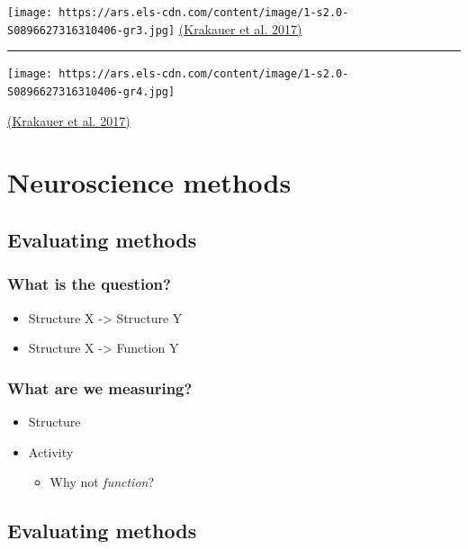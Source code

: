 \documentclass[]{article}
\providecommand{\tightlist}{%
  \setlength{\itemsep}{0pt}\setlength{\parskip}{0pt}}
\begin{document}
\texttt{[image: https://ars.els-cdn.com/content/image/1-s2.0-S0896627316310406-gr3.jpg]}
\href{http://dx.doi.org/10.1016/j.neuron.2016.12.041}{(Krakauer et al.
2017)}

\begin{center}\rule{0.5\linewidth}{\linethickness}\end{center}

\texttt{[image: https://ars.els-cdn.com/content/image/1-s2.0-S0896627316310406-gr4.jpg]}

\href{http://dx.doi.org/10.1016/j.neuron.2016.12.041}{(Krakauer et al.
2017)}

\section{Neuroscience methods}\label{neuroscience-methods}

\subsection{Evaluating methods}\label{evaluating-methods}

\subsubsection{What is the question?}\label{what-is-the-question}

\begin{itemize}
\tightlist
\item
  Structure X -\textgreater{} Structure Y
\item
  Structure X -\textgreater{} Function Y
\end{itemize}

\subsubsection{What are we measuring?}\label{what-are-we-measuring}

\begin{itemize}
\tightlist
\item
  Structure
\item
  Activity

  \begin{itemize}
  \tightlist
  \item
    Why not \emph{function}?
  \end{itemize}
\end{itemize}

\subsection{Evaluating methods}\label{evaluating-methods-1}
\end{document}
